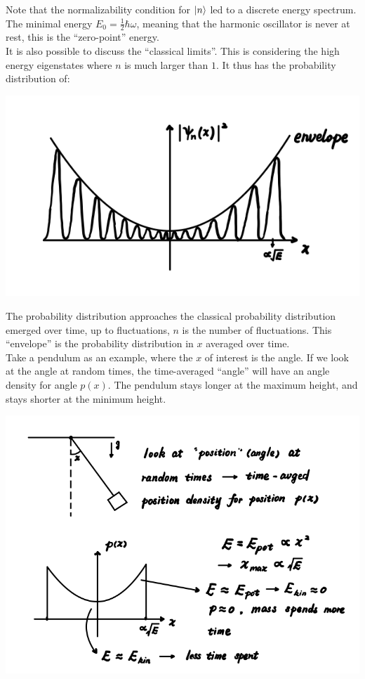 Note that the normalizability condition for $\ket{n}$ led to a discrete energy spectrum. The minimal energy $E_0 = \frac{1}{2}\hbar\omega$, meaning that the harmonic oscillator is never at rest, this is the ``zero-point'' energy. \\
It is also possible to discuss the ``classical limits''. This is considering the high energy eigenstates where $n$ is much larger than $1$. It thus has the probability distribution of:
\begin{center}
    \includegraphics[scale = 1]{ho-high-energy.png}
\end{center}
The probability distribution approaches the classical probability distribution emerged over time, up to fluctuations, $n$ is the number of fluctuations. This ``envelope'' is the probability distribution in $x$ averaged over time. \\
Take a pendulum as an example, where the $x$ of interest is the angle. If we look at the angle at random times, the time-averaged ``angle'' will have an angle density for angle $p(x)$. The pendulum stays longer at the maximum height, and stays shorter at the minimum height. 
\begin{center}
    \includegraphics[scale = 1]{ho-classical-lim.png}
\end{center}
